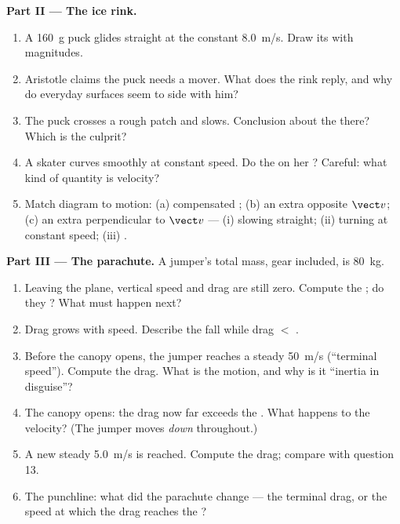 \begin{problem}
\medskip
\noindent\textbf{Part II --- The ice rink.}
\begin{enumerate}[resume]
  \item A \qty{160}{g} puck glides straight at the constant
        \qty{8.0}{m/s}. Draw its  with magnitudes.
  \item Aristotle claims the puck needs a mover. What does the rink
        reply, and why do everyday surfaces seem to side with him?
  \item The puck crosses a rough patch and slows. Conclusion about the
         there? Which  is the culprit?
  \item A skater curves smoothly at constant speed. Do the  on
        her ? Careful: what kind of quantity is velocity?
  \item Match diagram to motion: (a) compensated ; (b) an extra
         opposite $\vect v$; (c) an extra  perpendicular to
        $\vect v$ --- (i) slowing straight; (ii) turning at constant
        speed; (iii) .
\end{enumerate}

\medskip
\noindent\textbf{Part III --- The parachute.}
A jumper's total mass, gear included, is \qty{80}{kg}.
\begin{enumerate}[resume]
  \item Leaving the plane, vertical speed and drag are still zero.
        Compute the ; do they ? What must happen next?
  \item Drag grows with speed. Describe the fall while drag $<$ .
  \item Before the canopy opens, the jumper reaches a steady
        \qty{50}{m/s} (``terminal speed''). Compute the drag. What is
        the motion, and why is it ``inertia in disguise''?
  \item The canopy opens: the drag now far exceeds the . What
        happens to the velocity? (The jumper moves \emph{down}
        throughout.)
  \item A new steady \qty{5.0}{m/s} is reached. Compute the drag;
        compare with question 13.
  \item The punchline: what did the parachute change --- the terminal
        drag, or the speed at which the drag reaches the ?
\end{enumerate}


\end{problem}
